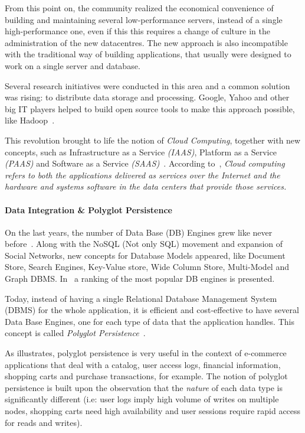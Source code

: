 \documentclass{article}
\begin{document}
From this point on, the community realized the economical convenience of building and maintaining several low-performance servers, instead of a single high-performance one, even if this this requires a change of culture in the administration of the new datacentres.
The new approach is also incompatible with the traditional way of building applications, that usually were designed to work on a single server and database. 

Several research initiatives were conducted in this area and a common solution was rising: to distribute data storage and processing. 
Google, Yahoo and other big IT players helped to build open source tools to make this approach possible, like Hadoop~\cite{5496972}.

This revolution brought to life the notion of \textit{Cloud Computing}, together with new concepts, such as Infrastructure as a Service \textit{(IAAS)}, Platform as a Service \textit{(PAAS)} and Software as a Service \textit{(SAAS)}~\cite{AViewOfCloudComputing}.
According to~\cite{AViewOfCloudComputing}, \textit{Cloud computing refers to both the applications delivered as services over the Internet and the hardware and systems software in the data centers that provide those services.} 


\paragraph*{Data Integration \& Polyglot Persistence}
On the last years, the number of Data Base (DB) Engines grew like never before~\cite{dbranking}. 
Along with the NoSQL (Not only SQL) movement and expansion of Social Networks, new concepts for Database Models appeared, like Document Store, Search Engines, Key-Value store, Wide Column Store, Multi-Model and Graph DBMS. 
In~\cite{dbranking} a ranking of the most popular DB engines is presented.

Today, instead of having a single Relational Database Management System (DBMS) for the whole application, it is efficient and cost-effective to have several Data Base Engines, one for each type of data that the application handles. 
This concept is called \textit{Polyglot Persistence}~\cite{sadalage2012nosql}.

As \cite{AdressingDataManagementCloud} illustrates, polyglot persistence is very useful in the context of  e-commerce applications that deal with a catalog, user access logs, financial information, shopping carts and purchase transactions, for example.
The notion of polyglot persistence is built upon the observation that the \textit{nature} of each data type is significantly different (i.e: user logs imply high volume of writes on multiple nodes, shopping carts need high availability and user sessions require rapid access for reads and writes). 
\end{document}
